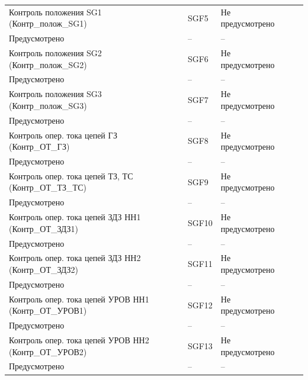 \begin{longtable}{|>{\centering\arraybackslash}m{5.3cm}|>{\centering\arraybackslash}m{3.3cm}|>{\centering\arraybackslash}m{4.2cm}|>{\centering\arraybackslash}m{1.8cm}|>{\centering\arraybackslash}m{1cm}|}
\hline
\centering Контроль положения SG1 (Контр\_полож\_SG1)  & \centering SGF5 & \centering Не предусмотрено \\ Предусмотрено & \centering -- & \centering \arraybackslash -- \\
\hline
\centering Контроль положения SG2 (Контр\_полож\_SG2)  & \centering SGF6 & \centering Не предусмотрено \\ Предусмотрено & \centering -- & \centering \arraybackslash -- \\
\hline
\centering Контроль положения SG3 (Контр\_полож\_SG3)  & \centering SGF7 & \centering Не предусмотрено \\ Предусмотрено & \centering -- & \centering \arraybackslash -- \\
\hline
\centering Контроль опер. тока цепей ГЗ (Контр\_ОТ\_ГЗ)  & \centering SGF8 & \centering Не предусмотрено \\ Предусмотрено & \centering -- & \centering \arraybackslash -- \\
\hline
\centering Контроль опер. тока цепей ТЗ, ТС (Контр\_ОТ\_ТЗ\_ТС)  & \centering SGF9 & \centering Не предусмотрено \\ Предусмотрено & \centering -- & \centering \arraybackslash -- \\
\hline
\centering Контроль опер. тока цепей ЗДЗ НН1 (Контр\_ОТ\_ЗДЗ1)  & \centering SGF10 & \centering Не предусмотрено \\ Предусмотрено & \centering -- & \centering \arraybackslash -- \\
\hline
\centering Контроль опер. тока цепей ЗДЗ НН2 (Контр\_ОТ\_ЗДЗ2)  & \centering SGF11 & \centering Не предусмотрено \\ Предусмотрено & \centering -- & \centering \arraybackslash -- \\
\hline
\centering Контроль опер. тока цепей УРОВ НН1 (Контр\_ОТ\_УРОВ1)  & \centering SGF12 & \centering Не предусмотрено \\ Предусмотрено & \centering -- & \centering \arraybackslash -- \\
\hline
\centering Контроль опер. тока цепей УРОВ НН2 (Контр\_ОТ\_УРОВ2)  & \centering SGF13 & \centering Не предусмотрено \\ Предусмотрено & \centering -- & \centering \arraybackslash -- \\
\hline
\end{longtable}
\normalsize
